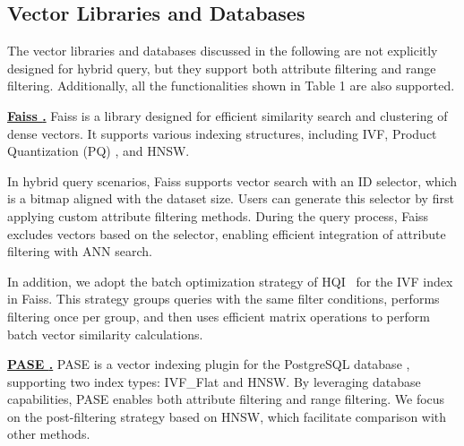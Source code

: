 \documentclass[sigconf, nonacm]{acmart}
\begin{document}
\subsection{Vector Libraries and Databases}

The vector libraries and databases discussed in the following are not explicitly designed for hybrid query, but they support both attribute filtering and range filtering. Additionally, all the functionalities shown in Table 1 are also supported.


\noindent\textbf{\underline{Faiss \cite{Faiss}.}} Faiss is a library designed for efficient similarity search and clustering of dense vectors. It supports various indexing structures, including IVF, Product Quantization (PQ) \cite{PQ}, and HNSW.

In hybrid query scenarios, Faiss supports vector search with an ID selector, which is a bitmap aligned with the dataset size. Users can generate this selector by first applying custom attribute filtering methods. During the query process, Faiss excludes vectors based on the selector, enabling efficient integration of attribute filtering with ANN search.

In addition, we adopt the batch optimization strategy of HQI~\cite{HQI} for the IVF index in Faiss. This strategy groups queries with the same filter conditions, performs filtering once per group, and then uses efficient matrix operations to perform batch vector similarity calculations.


\noindent\textbf{\underline{PASE \cite{pase}.}}  
PASE is a vector indexing plugin for the PostgreSQL database \cite{postgresql13.4}, supporting two index types: IVF\_Flat \cite{johnson2019billion} and HNSW. By leveraging database capabilities, PASE enables both attribute filtering and range filtering. We focus on the post-filtering strategy based on HNSW, which facilitate comparison with other methods.
\end{document}
